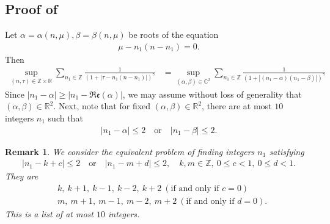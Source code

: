 \documentclass[12pt,reqno]{amsart}
\numberwithin{equation}{section}  %
\renewcommand{\cref}{\Cref}
\newcommand{\rr}{\mathbb{R}}
\newcommand{\zz}{\mathbb{Z}}
\newtheorem{remark}[theorem]{Remark}
\begin{document}
\begin{appendices}
\subsection{Proof of \cref{lem:sum-estimate}}
\label{ssec:pf-sum-est}
Let $\alpha = \alpha(n, \mu), \beta = \beta(n, \mu)$ be roots of the equation
%
%
\begin{equation*}
\begin{split}
  \mu - n_{1}(n - n_{1}) = 0.
\end{split}
\end{equation*}
%
%
Then 
%
%
\begin{equation*}
\begin{split}
\sup_{(n,\tau)\in \zz \times \rr}\sum_{n_1\in \zz}\frac{1}{(1+|\tau-
n_1(n-n_1)|)^{\gamma}}
& = \sup_{(\alpha, \beta )\in \mathbb{C}^{2}}\sum_{n_1\in \zz}\frac{1}{(1 +
|(n_{1} - \alpha)(n_{1} - \beta)|)^{\gamma}}
\end{split}
\end{equation*}
%
%
Since $| n_{1} - \alpha | \ge | n_{1} - \mathfrak{Re}(\alpha) |$, we may assume
without loss of generality that $(\alpha, \beta) \in \rr^{2}$. Next, note that
for fixed $(\alpha, \beta) \in \rr^{2}$, there are at most $10$ integers
$n_{1}$ such that
%
%
\begin{equation*}
\begin{split}
  | n_{1} - \alpha | \le 2 \quad \text{or} \quad | n_{1} - \beta | \le 2.
\end{split}
\end{equation*}
%
%
%
%
\begin{framed}
\begin{remark}
  We consider the equivalent problem of finding integers $n_{1}$ satisfying
  \begin{equation*}
\begin{split}
  | n_{1} - k +c | \le 2 \quad \text{or} \quad | n_{1} - m + d | \le 2, \quad k,
  m \in \zz, \ 0 \le c < 1, \ 0 \le d < 1.
\end{split}
\end{equation*}
They are
%
%
\begin{equation*}
\begin{split}
  &  k, \ k+1, \ k-1,
  \ k-2,  \ k+2 \ (\text{if and only if } c=0)
  \\
  &  m,  \ m+1, \ m-1,
  \ m-2,  \ m+2 \ (\text{if and only if } d=0).
\end{split}
\end{equation*}
%
%
%
%
This is a list of at most $10$ integers.
\label{rem:pf-counting}
\end{remark}

\end{framed}
\end{appendices}
\end{document}
